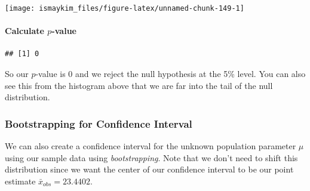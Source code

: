 \documentclass[]{tufte-book}
\newenvironment{Shaded}{\begin{snugshade}}{\end{snugshade}}
\newcommand{\KeywordTok}[1]{\textcolor[rgb]{0.13,0.29,0.53}{\textbf{{#1}}}}
\newcommand{\DataTypeTok}[1]{\textcolor[rgb]{0.13,0.29,0.53}{{#1}}}
\newcommand{\DecValTok}[1]{\textcolor[rgb]{0.00,0.00,0.81}{{#1}}}
\newcommand{\StringTok}[1]{\textcolor[rgb]{0.31,0.60,0.02}{{#1}}}
\newcommand{\OtherTok}[1]{\textcolor[rgb]{0.56,0.35,0.01}{{#1}}}
\newcommand{\NormalTok}[1]{{#1}}
\begin{document}
\begin{center}\texttt{[image: ismaykim\_files/figure-latex/unnamed-chunk-149-1]} \end{center}

\paragraph{\texorpdfstring{Calculate
\(p\)-value}{Calculate p-value}}\label{calculate-p-value}

\begin{Shaded}
\end{Shaded}

\begin{verbatim}
## [1] 0
\end{verbatim}

So our \(p\)-value is 0 and we reject the null hypothesis at the 5\%
level. You can also see this from the histogram above that we are far
into the tail of the null distribution.

\subsubsection{Bootstrapping for Confidence
Interval}\label{bootstrapping-for-confidence-interval}

We can also create a confidence interval for the unknown population
parameter \(\mu\) using our sample data using \emph{bootstrapping}. Note
that we don't need to shift this distribution since we want the center
of our confidence interval to be our point estimate
\(\bar{x}_{obs} = 23.4402\).

\begin{Shaded}
\end{Shaded}
\end{document}
